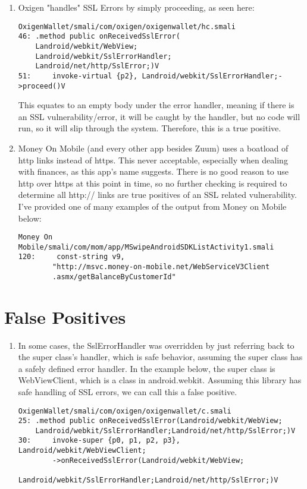 \documentclass[11pt]{article}
\begin{document}
\begin{enumerate}
    \item
        Oxigen "handles" SSL Errors by simply proceeding, as seen here:
\begin{verbatim}
OxigenWallet/smali/com/oxigen/oxigenwallet/hc.smali
46: .method public onReceivedSslError(
    Landroid/webkit/WebView;
    Landroid/webkit/SslErrorHandler;
    Landroid/net/http/SslError;)V
51:     invoke-virtual {p2}, Landroid/webkit/SslErrorHandler;->proceed()V
\end{verbatim}
        This equates to an empty body under the error handler, meaning if there is an SSL vulnerability/error, it will be caught by the handler, but no code will run, so it will slip through the system. Therefore, this is a true positive.

    \item 
    Money On Mobile (and every other app besides Zuum) uses a boatload of http links instead of https. This never acceptable, especially when dealing with finances, as this app's name suggests. There is no good reason to use http over https at this point in time, so no further checking is required to determine all http:// links are true positives of an SSL related vulnerability. I've provided one of many examples of the output from Money on Mobile below:
\begin{verbatim}
Money On Mobile/smali/com/mom/app/MSwipeAndroidSDKListActivity1.smali
120:     const-string v9, 
        "http://msvc.money-on-mobile.net/WebServiceV3Client
        .asmx/getBalanceByCustomerId"
\end{verbatim}

\end{enumerate}

\section{False Positives}
\begin{enumerate}
    \item In some cases, the SslErrorHandler was overridden by just referring back to the super class's handler, which is safe behavior, assuming the super class has a safely defined error handler. In the example below, the super class is WebViewClient, which is a class in android.webkit. Assuming this library has safe handling of SSL errors, we can call this a false positive.
\begin{verbatim}
OxigenWallet/smali/com/oxigen/oxigenwallet/c.smali
25: .method public onReceivedSslError(Landroid/webkit/WebView;
    Landroid/webkit/SslErrorHandler;Landroid/net/http/SslError;)V
30:     invoke-super {p0, p1, p2, p3}, Landroid/webkit/WebViewClient;
        ->onReceivedSslError(Landroid/webkit/WebView;
        Landroid/webkit/SslErrorHandler;Landroid/net/http/SslError;)V
\end{verbatim}



\end{enumerate}
\end{document}
